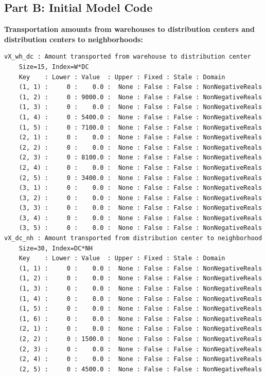 \documentclass[12pt]{article}
\begin{document}
\subsection{Part B: Initial Model Code}


\textbf{Transportation amounts from warehouses to distribution centers and distribution centers to neighborhoods:}
\begin{verbatim}
vX_wh_dc : Amount transported from warehouse to distribution center
    Size=15, Index=W*DC
    Key    : Lower : Value  : Upper : Fixed : Stale : Domain
    (1, 1) :     0 :    0.0 :  None : False : False : NonNegativeReals
    (1, 2) :     0 : 9000.0 :  None : False : False : NonNegativeReals
    (1, 3) :     0 :    0.0 :  None : False : False : NonNegativeReals
    (1, 4) :     0 : 5400.0 :  None : False : False : NonNegativeReals
    (1, 5) :     0 : 7100.0 :  None : False : False : NonNegativeReals
    (2, 1) :     0 :    0.0 :  None : False : False : NonNegativeReals
    (2, 2) :     0 :    0.0 :  None : False : False : NonNegativeReals
    (2, 3) :     0 : 8100.0 :  None : False : False : NonNegativeReals
    (2, 4) :     0 :    0.0 :  None : False : False : NonNegativeReals
    (2, 5) :     0 : 3400.0 :  None : False : False : NonNegativeReals
    (3, 1) :     0 :    0.0 :  None : False : False : NonNegativeReals
    (3, 2) :     0 :    0.0 :  None : False : False : NonNegativeReals
    (3, 3) :     0 :    0.0 :  None : False : False : NonNegativeReals
    (3, 4) :     0 :    0.0 :  None : False : False : NonNegativeReals
    (3, 5) :     0 :    0.0 :  None : False : False : NonNegativeReals
vX_dc_nh : Amount transported from distribution center to neighborhood
    Size=30, Index=DC*NH
    Key    : Lower : Value  : Upper : Fixed : Stale : Domain
    (1, 1) :     0 :    0.0 :  None : False : False : NonNegativeReals
    (1, 2) :     0 :    0.0 :  None : False : False : NonNegativeReals
    (1, 3) :     0 :    0.0 :  None : False : False : NonNegativeReals
    (1, 4) :     0 :    0.0 :  None : False : False : NonNegativeReals
    (1, 5) :     0 :    0.0 :  None : False : False : NonNegativeReals
    (1, 6) :     0 :    0.0 :  None : False : False : NonNegativeReals
    (2, 1) :     0 :    0.0 :  None : False : False : NonNegativeReals
    (2, 2) :     0 : 1500.0 :  None : False : False : NonNegativeReals
    (2, 3) :     0 :    0.0 :  None : False : False : NonNegativeReals
    (2, 4) :     0 :    0.0 :  None : False : False : NonNegativeReals
    (2, 5) :     0 : 4500.0 :  None : False : False : NonNegativeReals

\end{verbatim}
\end{document}
